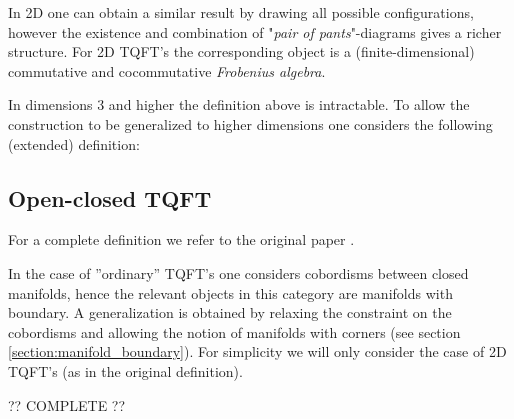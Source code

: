     \begin{example}[2D]
        In 2D one can obtain a similar result by drawing all possible configurations, however the existence and combination of "\textit{pair of pants}"-diagrams gives a richer structure. For 2D TQFT's the corresponding object is a (finite-dimensional) commutative and cocommutative \textit{Frobenius algebra}.
    \end{example}

    In dimensions 3 and higher the definition above is intractable. To allow the construction to be generalized to higher dimensions one considers the following (extended) definition:

\subsection{Open-closed TQFT}

    For a complete definition we refer to the original paper \cite{open_closed}.

    In the case of ''ordinary'' TQFT's one considers cobordisms between closed manifolds, hence the relevant objects in this category are manifolds with boundary. A generalization is obtained by relaxing the constraint on the cobordisms and allowing the notion of manifolds with corners (see section \ref{section:manifold_boundary}). For simplicity we will only consider the case of 2D TQFT's (as in the original definition).

    ?? COMPLETE ??